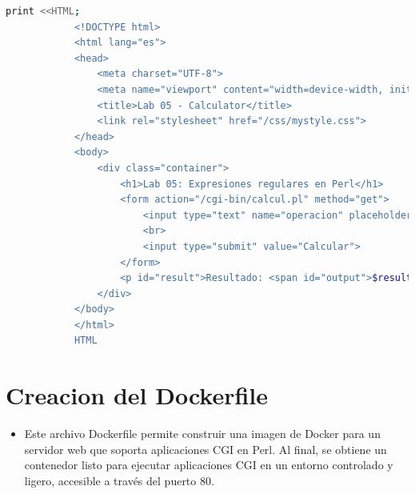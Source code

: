\documentclass{article}
\begin{document}
        \begin{lstlisting}[language=bash,caption={Por ultimo en este fragmento finaliza el script, generando la estructura HTML de la calculadora con el resultado. Es fundamental en CGI para mostrar el resultado de la operación ingresada.}, label={lst:color-boton}]
            print <<HTML;
            <!DOCTYPE html>
            <html lang="es">
            <head>
                <meta charset="UTF-8">
                <meta name="viewport" content="width=device-width, initial-scale=1.0">
                <title>Lab 05 - Calculator</title>
                <link rel="stylesheet" href="/css/mystyle.css">
            </head>
            <body>
                <div class="container">
                    <h1>Lab 05: Expresiones regulares en Perl</h1>
                    <form action="/cgi-bin/calcul.pl" method="get">
                        <input type="text" name="operacion" placeholder="operacion" required>
                        <br>
                        <input type="submit" value="Calcular">
                    </form>
                    <p id="result">Resultado: <span id="output">$resultado_final</span></p>
                </div>
            </body>
            </html>
            HTML

        \end{lstlisting}

    \section{Creacion del Dockerfile}
        \begin{itemize}
            \item Este archivo Dockerfile permite construir una imagen de Docker para un servidor web que soporta aplicaciones CGI en Perl. Al final, se obtiene un contenedor listo para ejecutar aplicaciones CGI en un entorno controlado y ligero, accesible a través del puerto 80.
        \end{itemize}
\end{document}
